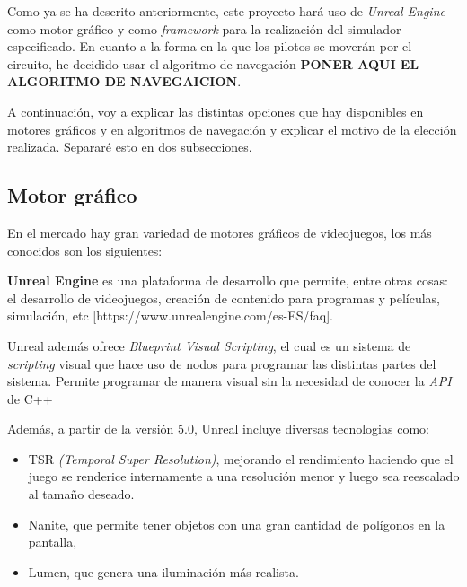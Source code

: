 \documentclass[a4paper,11pt]{book}
\begin{document}
Como ya se ha descrito anteriormente, este proyecto hará uso de \textit{Unreal Engine} como motor gráfico y como \textit{framework} para la realización del simulador especificado. En cuanto a la forma en la que los pilotos se moverán por el circuito, he decidido usar el algoritmo de navegación \textbf{PONER AQUI EL ALGORITMO DE NAVEGAICION}.

\bigskip

A continuación, voy a explicar las distintas opciones que hay disponibles en motores gráficos y en algoritmos de navegación y explicar el motivo de la elección realizada. Separaré esto en dos subsecciones.

\subsection{Motor gráfico}
En el mercado hay gran variedad de motores gráficos de videojuegos, los más conocidos son los siguientes:

\bigskip
\textbf{Unreal Engine} es una plataforma de desarrollo que permite, entre otras cosas: el desarrollo de videojuegos, creación de contenido para programas y películas, simulación, etc [https://www.unrealengine.com/es-ES/faq]. 

\bigskip

Unreal además ofrece \textit{Blueprint Visual Scripting}, el cual es un sistema de \textit{scripting} visual que hace uso de nodos para programar las distintas partes del sistema. Permite programar de manera visual sin la necesidad de conocer la \textit{API} de C++ %



\bigskip

Además, a partir de la versión 5.0, Unreal incluye diversas tecnologias como: 

\begin{itemize}
   \item TSR \textit{(Temporal Super Resolution)}, mejorando el rendimiento haciendo que el juego se renderice internamente a una resolución menor y luego sea reescalado al tamaño deseado.
   \item Nanite, que permite tener objetos con una gran cantidad de polígonos en la pantalla, 
   \item Lumen, que genera una iluminación más realista. %
\end{itemize}
\end{document}
